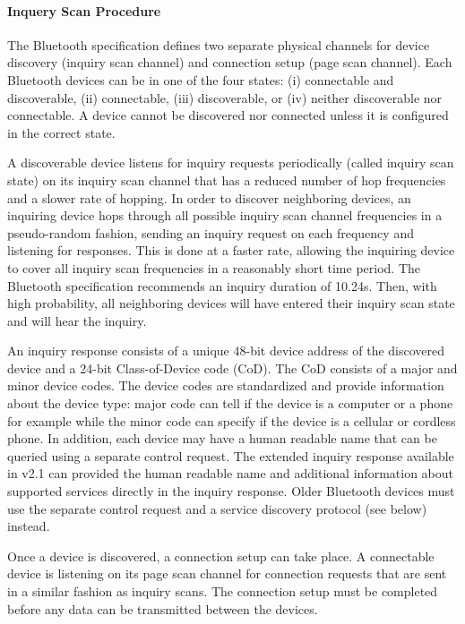 \paragraph*{Inquery Scan Procedure}

The Bluetooth specification defines two separate physical channels for device discovery (inquiry scan channel) and connection setup (page scan channel).  Each Bluetooth devices can be in one of the four states: (i) connectable and discoverable, (ii) connectable, (iii) discoverable, or (iv) neither discoverable nor connectable. A device cannot be discovered nor connected unless it is configured in the correct state.

A discoverable device listens for inquiry requests periodically (called inquiry scan state) on its inquiry scan channel that has a reduced number of hop frequencies and a slower rate of hopping. In order to discover neighboring devices, an inquiring device hops through all possible inquiry scan channel frequencies in a pseudo-random fashion, sending an inquiry request on each frequency and listening for responses. This is done at a faster rate, allowing the inquiring device to cover all inquiry scan frequencies in a reasonably short time period. The Bluetooth specification recommends an inquiry duration of 10.24s. Then, with high probability, all neighboring devices will have entered their inquiry scan state and will hear the inquiry.

An inquiry response consists of a unique 48-bit device address of the discovered device and a 24-bit Class-of-Device code (CoD). The CoD consists of a major and minor device codes. The device codes are standardized and provide information about the device type: major code can tell if the device is a computer or a phone for example while the minor code can specify if the device is a cellular or cordless phone. In addition, each device may have a human readable name that can be queried using a separate control request. The extended inquiry response available in v2.1 can provided the human readable name and additional information about supported services directly in the inquiry response. Older Bluetooth devices must use the separate control request and a service discovery protocol (see below) instead.

Once a device is discovered, a connection setup can take place. A connectable device is listening on its page scan channel for connection requests that are sent in a similar fashion as inquiry scans. The connection setup must be completed before any data can be transmitted between the devices.

